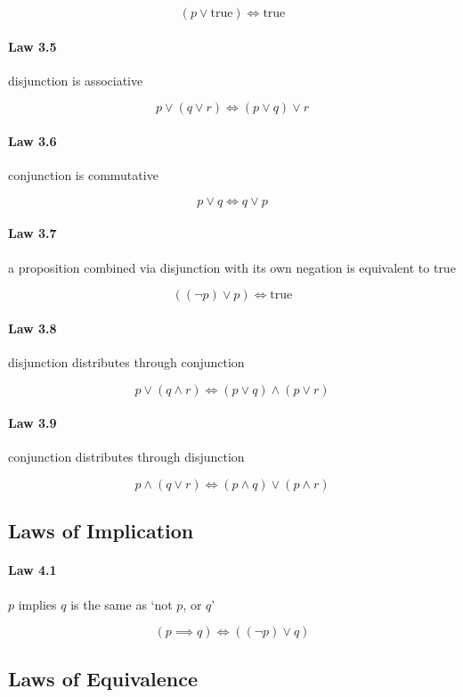 \documentclass[twocolumn]{article}
\begin{document}
$$ (p  \vee  \text{true})  \iff  \text{true} $$

\paragraph{Law 3.5} disjunction is associative

$$ p  \vee  (q  \vee  r)  \iff  (p  \vee  q)  \vee  r $$

\paragraph{Law 3.6} conjunction is commutative

$$ p \vee q  \iff q \vee p $$

\paragraph{Law 3.7} a proposition combined via disjunction with its own negation is equivalent to true

$$ (( \neg p)  \vee  p)  \iff  \text{true} $$

\paragraph{Law 3.8} disjunction distributes through conjunction

$$ p  \vee  (q  \wedge  r)  \iff  (p  \vee  q)  \wedge  (p  \vee  r) $$

\paragraph{Law 3.9} conjunction distributes through disjunction

$$ p  \wedge  (q  \vee  r)  \iff  (p  \wedge  q)  \vee  (p  \wedge  r) $$

\subsection{Laws of Implication}

\paragraph{Law 4.1} $p$ implies $q$ is the same as `not $p$, or $q$'

$$ (p  \implies   q)  \iff  (( \neg p)  \vee  q) $$

\subsection{Laws of Equivalence}
\end{document}
